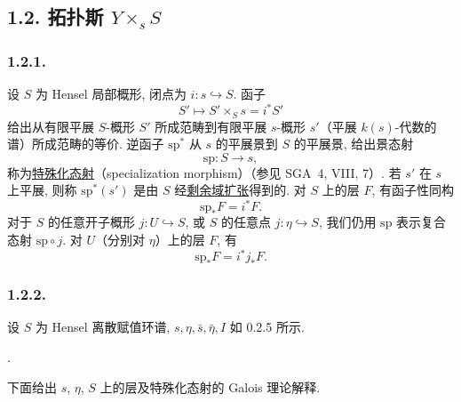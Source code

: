 \subsection*{1.2. 拓扑斯 $Y\times_s S$}

\subsubsection*{1.2.1.}
设 $S$ 为 Hensel 局部概形, 闭点为 $i:s\hookrightarrow S$. 函子
\begin{equation*}
S'\longmapsto S'\times_Ss=i^*S'
\end{equation*}
给出从有限平展 $S$-概形 $S'$ 所成范畴到有限平展 $s$-概形 $s'$（平展 $k(s)$-代数的谱）所成范畴的等价. 逆函子 $\mathrm{sp}^*$ 从 $s$ 的平展景到 $S$ 的平展景, 给出景态射
\begin{equation*}
\mathrm{sp}:S\longrightarrow s,
\end{equation*}
称为\underline{特殊化态射}（specialization morphism）（参见 SGA~4, VIII, 7）. 若 $s'$ 在 $s$ 上平展, 则称 $\mathrm{sp}^*(s')$ 是由 $S$ 经\underline{剩余域扩张}得到的. 对 $S$ 上的层 $F$, 有函子性同构
\begin{equation}\tag{1.2.1.1}
\mathrm{sp}_*F=i^*F.
\end{equation}
对于 $S$ 的任意开子概形 $j:U\hookrightarrow S$, 或 $S$ 的任意点 $j:\eta\hookrightarrow S$, 我们仍用 $\mathrm{sp}$ 表示复合态射 $\mathrm{sp}\circ j$. 对 $U$（分别对 $\eta$）上的层 $F$, 有
\begin{equation}\tag{1.2.1.2}
\mathrm{sp}_*F=i^*j_*F.
\end{equation}

\subsubsection*{1.2.2.}
设 $S$ 为 Hensel 离散赋值环谱, $s,\eta,\bar s,\bar\eta,I$ 如 0.2.5 所示.
\begin{center}
.\end{center}
下面给出 $s$, $\eta$, $S$ 上的层及特殊化态射的 Galois 理论解释.

